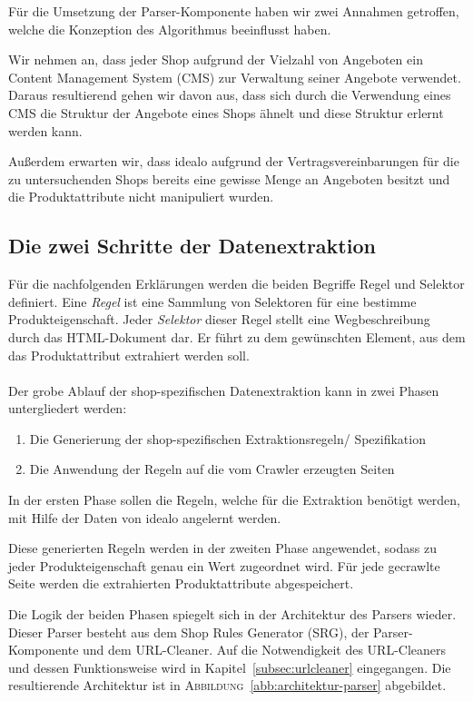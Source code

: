 Für die Umsetzung der Parser-Komponente haben wir zwei Annahmen getroffen, welche die Konzeption des Algorithmus
beeinflusst haben.

Wir nehmen an, dass jeder Shop aufgrund der Vielzahl von Angeboten ein Content Management System (CMS) zur Verwaltung
seiner Angebote verwendet.
Daraus resultierend gehen wir davon aus, dass sich durch die Verwendung eines CMS die Struktur der Angebote eines Shops
ähnelt und diese Struktur erlernt werden kann.

Außerdem erwarten wir, dass idealo aufgrund der Vertragsvereinbarungen für die zu untersuchenden Shops bereits
eine gewisse Menge an Angeboten besitzt und die Produktattribute nicht manipuliert wurden.

\subsection{Die zwei Schritte der Datenextraktion}
\label{subsec:grundidee}

Für die nachfolgenden Erklärungen werden die beiden Begriffe Regel und Selektor definiert.
Eine \textit{Regel} ist eine Sammlung von Selektoren für eine bestimme Produkteigenschaft.
Jeder \textit{Selektor} dieser Regel stellt eine Wegbeschreibung durch das HTML-Dokument dar.
Er führt zu dem gewünschten Element, aus dem das Produktattribut extrahiert werden soll.
\\
~\\
Der grobe Ablauf der shop-spezifischen Datenextraktion kann in zwei Phasen untergliedert werden:
\begin{enumerate}
    \item Die Generierung der shop-spezifischen Extraktionsregeln/ Spezifikation
    \item Die Anwendung der Regeln auf die vom Crawler erzeugten Seiten
\end{enumerate}

In der ersten Phase sollen die Regeln, welche für die Extraktion benötigt werden, mit Hilfe der Daten von idealo
angelernt werden.

Diese generierten Regeln werden in der zweiten Phase angewendet, sodass zu jeder Produkteigenschaft genau ein Wert
zugeordnet wird.
Für jede gecrawlte Seite werden die extrahierten Produktattribute abgespeichert.

Die Logik der beiden Phasen spiegelt sich in der Architektur des Parsers wieder.
Dieser Parser besteht aus dem Shop Rules Generator (SRG), der Parser-Komponente und dem URL-Cleaner.
Auf die Notwendigkeit des URL-Cleaners und dessen Funktionsweise wird in Kapitel~\ref{subsec:urlcleaner} eingegangen.
Die resultierende Architektur ist in \textsc{Abbildung}~\ref{abb:architektur-parser} abgebildet.

